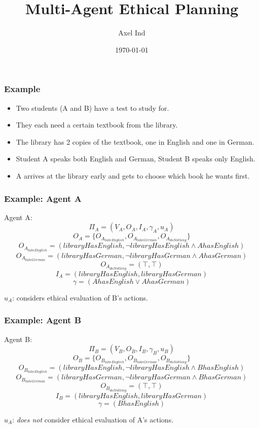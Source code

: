 \documentclass{beamer}
\title{Multi-Agent Ethical Planning}
\author{Axel Ind}
\institute{Uni-Freiburg}
\date{\today}
\begin{document}
 
\frame{\titlepage}

\begin{frame}
\frametitle{Example}
\begin{itemize}
\item Two students (A and B) have a test to study for.
\item They each need a certain textbook from the library. 
\item The library has 2 copies of the textbook, one in English and one in German.
\item Student A speaks both English and German, Student B speaks only English.
\item A arrives at the library early and gets to choose which book he wants first.
\end{itemize}

\end{frame}

 
\begin{frame}
\frametitle{Example: Agent A}
Agent A:
\[
\Pi_A = (V_A, O_A, I_A, \gamma_A, u_A)
\]
\[
O_A = \{ O_{A_{takeEnglish}}, O_{A_{takeGerman}}, O_{A_{doNothing}}\}
\]
\[
O_{A_{takeEnglish}}=(libraryHasEnglish, \lnot libraryHasEnglish \land AhasEnglish)
\]
\[
O_{A_{takeGerman}}=(libraryHasGerman, \lnot libraryHasGerman \land AhasGerman)
\]
\[
O_{A_{doNothing}}=(\top, \top)
\]
\[
I_A = (libraryHasEnglish, libraryHasGerman)
\]
\[
\gamma = (AhasEnglish \lor AhasGerman)
\]

$u_A$: considers ethical evaluation of B's actions.

\end{frame}

\begin{frame}
\frametitle{Example: Agent B}
Agent B:
\[
\Pi_B = (V_B, O_B, I_B, \gamma_B, u_B)
\]
\[
O_B = \{ O_{B_{takeEnglish}}, O_{B_{takeGerman}}, O_{B_{doNothing}}\}
\]
\[
O_{B_{takeEnglish}}=(libraryHasEnglish, \lnot libraryHasEnglish \land BhasEnglish)
\]
\[
O_{B_{takeGerman}}=(libraryHasGerman, \lnot libraryHasGerman \land BhasGerman)
\]
\[
O_{B_{doNothing}}=(\top, \top)
\]
\[
I_B = (libraryHasEnglish, libraryHasGerman)
\]
\[
\gamma = (BhasEnglish)
\]

$u_A$: \textit{does not} consider ethical evaluation of A's actions.
\end{frame}
\end{document}
